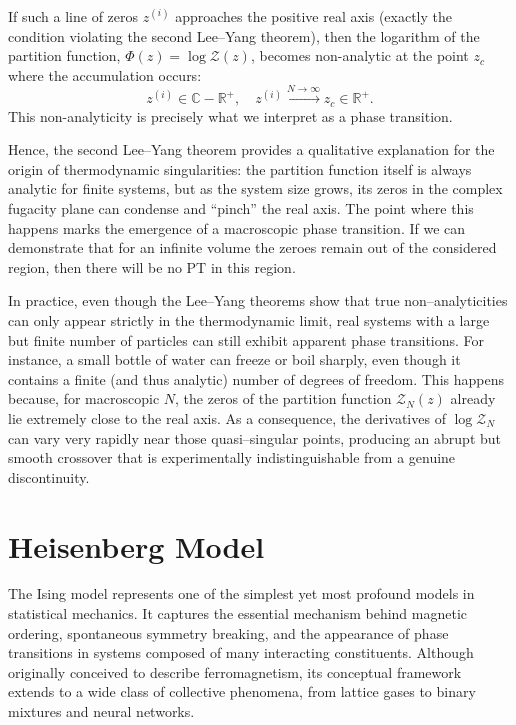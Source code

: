 If such a line of zeros \(z^{(i)}\) approaches the positive real axis (exactly the condition violating the second Lee--Yang theorem), then the logarithm of the partition function, \( \Phi(z) = \log \mathcal{Z}(z)\), becomes non-analytic at the point \(z_c\) where the accumulation occurs:
\[
    z^{(i)} \in \mathbb{C} - \mathbb{R}^+, \quad z^{(i)} \xrightarrow{N\to \infty} z_c \in \mathbb{R}^+.
\]
This non-analyticity is precisely what we interpret as a phase transition.

Hence, the second Lee--Yang theorem provides a qualitative explanation for the origin of thermodynamic singularities: the partition function itself is always analytic for finite systems, but as the system size grows, its zeros in the complex fugacity plane can condense and ``pinch'' the real axis. The point where this happens marks the emergence of a macroscopic phase transition. If we can demonstrate that for an infinite volume the zeroes remain out of the considered region, then there will be no PT in this region.

\begin{remark}
    In practice, even though the Lee--Yang theorems show that true non--analyticities can only appear strictly in the thermodynamic limit, real systems with a large but finite number of particles can still exhibit apparent phase transitions.
    For instance, a small bottle of water can freeze or boil sharply, even though it contains a finite (and thus analytic) number of degrees of freedom. This happens because, for macroscopic \(N\), the zeros of the partition function \(\mathcal{Z}_N(z)\) already lie extremely close to the real axis.
    As a consequence, the derivatives of \(\log \mathcal{Z}_N\) can vary very rapidly near those quasi--singular points, producing an abrupt but smooth crossover that is experimentally indistinguishable from a genuine discontinuity.
\end{remark}

\section{Heisenberg Model}

The Ising model represents one of the simplest yet most profound models in statistical mechanics.
It captures the essential mechanism behind magnetic ordering, spontaneous symmetry breaking, and the appearance of phase transitions in systems composed of many interacting constituents.
Although originally conceived to describe ferromagnetism, its conceptual framework extends to a wide class of collective phenomena, from lattice gases to binary mixtures and neural networks.

